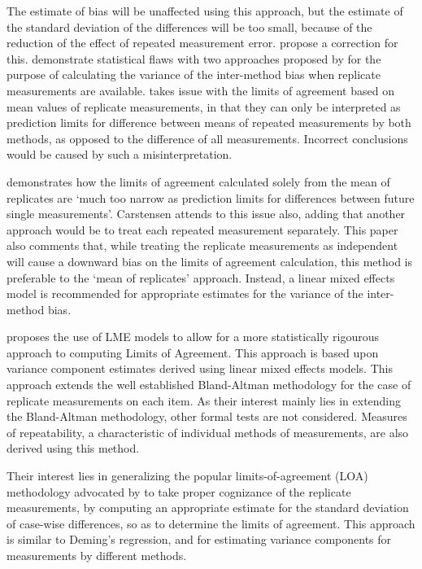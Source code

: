 \documentclass[12pt, a4paper]{report}
\theoremstyle{plain}
\theoremstyle{definition}
\theoremstyle{remark}
\begin{document}
The estimate of bias will be unaffected using this approach, but the estimate of the standard deviation of the differences will be too small, because of the reduction of the effect of repeated measurement error. \citet{BA99} propose a correction for this. \citet{BXC2008} demonstrate statistical flaws with two approaches proposed by \citet{BA99} for the purpose of calculating the variance of the inter-method bias when replicate measurements are available.
\citet{BXC2008} takes issue with the limits of agreement based on
mean values of replicate measurements, in that they can only be interpreted as prediction
limits for difference between means of repeated measurements by
both methods, as opposed to the difference of all measurements.
Incorrect conclusions would be caused by such a misinterpretation.

\citet{BXC2008} demonstrates how the limits of agreement calculated solely from the mean of replicates are `much too narrow as
prediction limits for differences between future single measurements'. Carstensen attends to this issue also, adding that another approach would be to treat each repeated measurement separately. This paper also comments that, while treating the
replicate measurements as independent will cause a downward bias
on the limits of agreement calculation, this method is preferable to the `mean of replicates' approach. Instead, a linear mixed effects model is recommended for appropriate estimates for the variance of the inter-method bias. 


%

\citet{BXC2008} proposes the use of LME models to allow for a more statistically rigourous approach to computing Limits of Agreement. This approach is based upon variance component estimates derived using
linear mixed effects models. This approach extends the well established Bland-Altman methodology for the case of replicate measurements on each item. As their interest mainly lies in extending the Bland-Altman methodology, other formal tests are not considered.  Measures of repeatability, a
characteristic of individual methods of measurements, are also
derived using this method.


Their interest lies in generalizing the popular limits-of-agreement (LOA) methodology advocated by \citet{BA86} to take proper cognizance of the replicate measurements, by computing an appropriate estimate for the standard deviation of case-wise differences, so as to determine the limits of agreement.  This approach is similar to Deming's regression, and for estimating variance components for measurements by different methods. 
\end{document}
